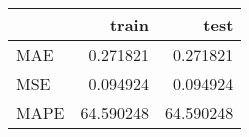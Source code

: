 \begin{tabular}{lrr}
\toprule
{} &      train &       test \\
\midrule
MAE  &   0.271821 &   0.271821 \\
MSE  &   0.094924 &   0.094924 \\
MAPE &  64.590248 &  64.590248 \\
\bottomrule
\end{tabular}
